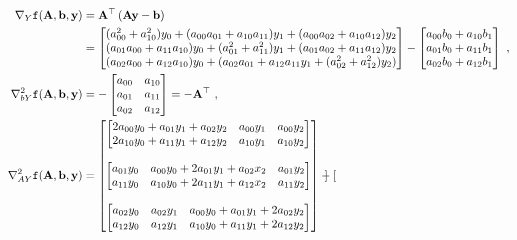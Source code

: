 \begin{align}
\nabla_Y \texttt{f}(\mb{A}, \mb{b}, \mb{y})
&= \mb{A}^\top \left( \mb{A} \mb{y} - \mb{b} \right) \nonumber \\
&=
\begin{bmatrix}
(a_{00}^2 + a_{10}^2) y_0 + (a_{00} a_{01} + a_{10} a_{11}) y_1 + (a_{00} a_{02} + a_{10} a_{12}) y_2 \\
(a_{01} a_{00} + a_{11} a_{10}) y_0 + (a_{01}^2 + a_{11}^2) y_1 + (a_{01} a_{02} + a_{11} a_{12}) y_2 \\
(a_{02} a_{00} + a_{12} a_{10}) y_0 + (a_{02} a_{01} + a_{12} a_{11} y_1 + (a_{02}^2 + a_{12}^2) y_2)
\end{bmatrix}
-
\begin{bmatrix}
a_{00} b_0+ a_{10} b_1 \\
a_{01} b_0 + a_{11} b_1 \\
a_{02} b_0 + a_{12} b_1
\end{bmatrix}\ ,\\
\nabla^2_{bY} \texttt{f}(\mb{A}, \mb{b}, \mb{y})
&=
-\begin{bmatrix}
a_{00} & a_{10} \\
a_{01} & a_{11} \\
a_{02} & a_{12}
\end{bmatrix}
=-\mb{A}^\top\ , \\
\nabla^2_{AY} \texttt{f}(\mb{A}, \mb{b}, \mb{y})
&=
\begin{bmatrix}
\begin{bmatrix}
2a_{00} y_0 + a_{01} y_1 + a_{02} y_2 & a_{00} y_1 & a_{00} y_2 \\
2a_{10} y_0 + a_{11} y_1 + a_{12} y_2 & a_{10} y_1 & a_{10} y_2
\end{bmatrix} \\ \\
%
\begin{bmatrix}
a_{01} y_0 & a_{00} y_0 + 2a_{01} y_1 + a_{02} x_2 & a_{01} y_2 \\
a_{11} y_0 & a_{10} y_0 + 2a_{11} y_1 + a_{12} x_2 &  a_{11} y_2
\end{bmatrix} \\ \\
%
\begin{bmatrix}
a_{02} y_0 & a_{02} y_1 & a_{00} y_0 + a_{01} y_1 + 2a_{02} y_2 \\
a_{12} y_0 & a_{12} y_1 & a_{10} y_0 + a_{11} y_1 + 2a_{12} y_2
\end{bmatrix}
\end{bmatrix}
-
\begin{bmatrix}

\end{bmatrix}
\end{align}

